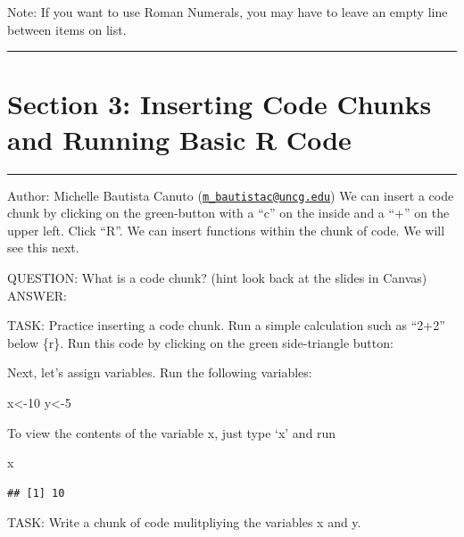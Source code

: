 \documentclass[
]{article}
\newenvironment{Shaded}{\begin{snugshade}}{\end{snugshade}}
\newcommand{\DecValTok}[1]{\textcolor[rgb]{0.00,0.00,0.81}{#1}}
\newcommand{\NormalTok}[1]{#1}
\newcommand{\OtherTok}[1]{\textcolor[rgb]{0.56,0.35,0.01}{#1}}
\begin{document}
Note: If you want to use Roman Numerals, you may have to leave an empty
line between items on list.

\begin{center}\rule{0.5\linewidth}{0.5pt}\end{center}

\section{Section 3: Inserting Code Chunks and Running Basic R
Code}\label{section-3-inserting-code-chunks-and-running-basic-r-code}

\begin{center}\rule{0.5\linewidth}{0.5pt}\end{center}

Author: Michelle Bautista Canuto
(\href{mailto:m_bautistac@uncg.edu}{\nolinkurl{m\_bautistac@uncg.edu}})
We can insert a code chunk by clicking on the green-button with a ``c''
on the inside and a ``+'' on the upper left. Click ``R''. We can insert
functions within the chunk of code. We will see this next.

QUESTION: What is a code chunk? (hint look back at the slides in Canvas)
ANSWER:

TASK: Practice inserting a code chunk. Run a simple calculation such as
``2+2'' below \{r\}. Run this code by clicking on the green
side-triangle button:

Next, let's assign variables. Run the following variables:

\begin{Shaded}
\begin{Highlighting}[]
\NormalTok{x}\OtherTok{\textless{}{-}}\DecValTok{10}
\NormalTok{y}\OtherTok{\textless{}{-}}\DecValTok{5}
\end{Highlighting}
\end{Shaded}

To view the contents of the variable x, just type `x' and run

\begin{Shaded}
\begin{Highlighting}[]
\NormalTok{x}
\end{Highlighting}
\end{Shaded}

\begin{verbatim}
## [1] 10
\end{verbatim}

TASK: Write a chunk of code mulitpliying the variables x and y.
\end{document}
